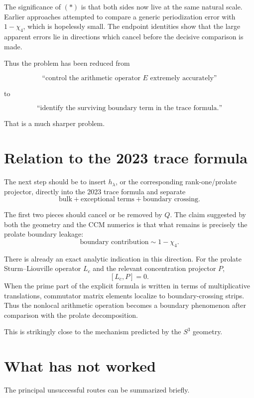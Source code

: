 \documentclass[11pt]{article}
\begin{document}
The significance of \((*)\) is that both sides now live at the same
natural scale.  Earlier approaches attempted to compare a generic
periodization error with \(1-\chi_4\), which is hopelessly small.
The endpoint identities show that the large apparent errors lie in
directions which cancel before the decisive comparison is made.

Thus the problem has been reduced from

\[
\text{``control the arithmetic operator }E\text{ extremely accurately''}
\]

to

\[
\text{``identify the surviving boundary term in the trace formula.''}
\]

That is a much sharper problem.

\section{Relation to the 2023 trace formula}

The next step should be to insert \(h_\lambda\), or the corresponding
rank-one/prolate projector, directly into the 2023 trace formula and
separate
\[
        \text{bulk}
        +
        \text{exceptional terms}
        +
        \text{boundary crossing}.
\]

The first two pieces should cancel or be removed by \(Q\).  The claim
suggested by both the geometry and the CCM numerics is that what remains
is precisely the prolate boundary leakage:
\[
        \text{boundary contribution}
        \sim
        1-\chi_4.
\]

There is already an exact analytic indication in this direction.
For the prolate Sturm--Liouville operator \(L_c\) and the relevant
concentration projector \(P\),
\[
        [L_c,P]=0.
\]
When the prime part of the explicit formula is written in terms of
multiplicative translations, commutator matrix elements localize to
boundary-crossing strips.  Thus the nonlocal arithmetic operation becomes
a boundary phenomenon after comparison with the prolate decomposition.

This is strikingly close to the mechanism predicted by the \(S^3\)
geometry.

\section{What has not worked}

The principal unsuccessful routes can be summarized briefly.
\end{document}
